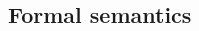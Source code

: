 \documentclass[twoside,twocolumn]{algol60}
\begin{document}
\begin{CJK*}{UTF8}{gbsn}
\chapter{Formal semantics}
\label{formalsemanticschapter}
 \par
 \par
 \par
 \par
 \par
\newpage
\renewcommand{\bibname}{References}




\vfill\eject


\newcommand{\indexheading}{Alphabetic index of definitions of
  concepts, keywords, and procedures}
\texonly
\newcommand{\indexintro}{The index includes entries from the library
  document; the entries are marked with ``(library)''.}
\endtexonly

\printindex

\clearpage\end{CJK*}                              %
\end{document}
